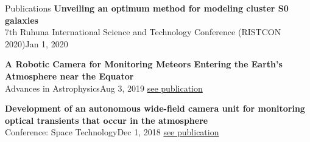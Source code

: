 \documentclass[
	11pt, %
]{./assets/resume} %
\begin{document}
\begin{rSection}{Publications}
	\textbf{Unveiling an optimum method for modeling cluster S0 galaxies} \\
	{7th Ruhuna International Science and Technology Conference (RISTCON 2020)}{Jan 1, 2020}

	\textbf{A Robotic Camera for Monitoring Meteors Entering the Earth’s Atmosphere near the Equator} \\
	{Advances in Astrophysics}{Aug 3, 2019}
	\href{http://www.isaacpub.org/images/PaperPDF/AdAp_100132_2019082716321960559.pdf}{see publication}

	\textbf{Development of an autonomous wide-field camera unit for monitoring optical transients that occur in the atmosphere} \\
	{Conference: Space Technology}{Dec 1, 2018}
	\href{https://www.researchgate.net/publication/332246125_Development_of_an_autonomous_wide-field_camera_unit_for_monitoring_optical_transients_that_occur_in_the_atmosphere}{see publication}

\end{rSection}






\end{document}
